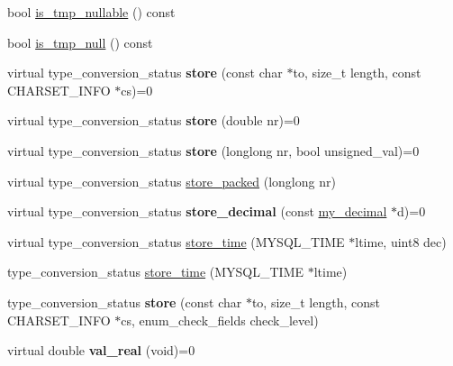 \begin{DoxyCompactItemize}
\item 
bool \mbox{\hyperlink{classField_a7a61056ae427bbcd7e7ac2efbbf25bd0}{is\+\_\+tmp\+\_\+nullable}} () const
\item 
bool \mbox{\hyperlink{classField_aacac876b52d64a83e40403fcd78b199e}{is\+\_\+tmp\+\_\+null}} () const
\item 
\mbox{\label{classField_a9501b8234a37829a8c3ceef179156619}} 
virtual type\+\_\+conversion\+\_\+status {\bfseries store} (const char $\ast$to, size\+\_\+t length, const C\+H\+A\+R\+S\+E\+T\+\_\+\+I\+N\+FO $\ast$cs)=0
\item 
\mbox{\label{classField_a086fb368e1adcb5b3b1ea11ffb99e6e1}} 
virtual type\+\_\+conversion\+\_\+status {\bfseries store} (double nr)=0
\item 
\mbox{\label{classField_a61f4c4ae614c7e0a9d8a98bf8b662370}} 
virtual type\+\_\+conversion\+\_\+status {\bfseries store} (longlong nr, bool unsigned\+\_\+val)=0
\item 
virtual type\+\_\+conversion\+\_\+status \mbox{\hyperlink{classField_a5c09752e8441d64ce2e4e611508bab7a}{store\+\_\+packed}} (longlong nr)
\item 
\mbox{\label{classField_a327fa2d7fd5fa6f199d0fd5d380a0335}} 
virtual type\+\_\+conversion\+\_\+status {\bfseries store\+\_\+decimal} (const \mbox{\hyperlink{classmy__decimal}{my\+\_\+decimal}} $\ast$d)=0
\item 
virtual type\+\_\+conversion\+\_\+status \mbox{\hyperlink{classField_a7433aa07355def6c394687567256e6cf}{store\+\_\+time}} (M\+Y\+S\+Q\+L\+\_\+\+T\+I\+ME $\ast$ltime, uint8 dec)
\item 
type\+\_\+conversion\+\_\+status \mbox{\hyperlink{classField_a2c0631841b33f2912380400afe77daa8}{store\+\_\+time}} (M\+Y\+S\+Q\+L\+\_\+\+T\+I\+ME $\ast$ltime)
\item 
\mbox{\label{classField_a415e1de7555a36502f9ed45e90ea57e0}} 
type\+\_\+conversion\+\_\+status {\bfseries store} (const char $\ast$to, size\+\_\+t length, const C\+H\+A\+R\+S\+E\+T\+\_\+\+I\+N\+FO $\ast$cs, enum\+\_\+check\+\_\+fields check\+\_\+level)
\item 
\mbox{\label{classField_afd7a976b963bc42b5a8903eaccf75a75}} 
virtual double {\bfseries val\+\_\+real} (void)=0

\end{DoxyCompactItemize}

